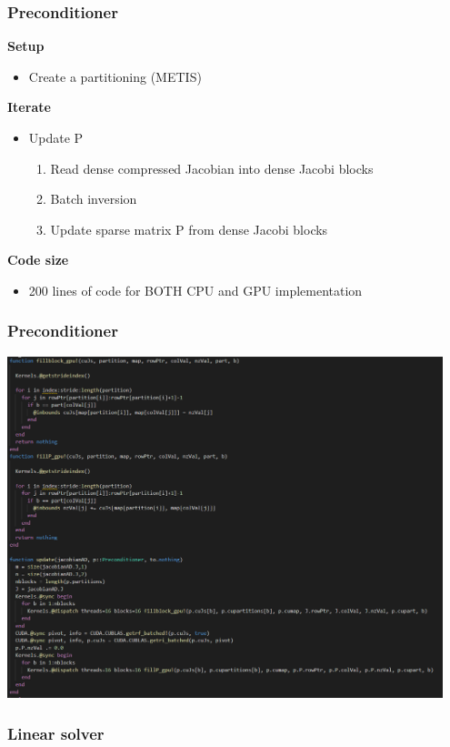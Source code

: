 \begin{frame}
  \frametitle{Preconditioner}
  {\bf Setup}
  \begin{itemize}
    \item Create a partitioning (METIS)
  \end{itemize}
  {\bf Iterate}
  \begin{itemize}
    \item Update P
    \begin{enumerate}
      \item Read dense compressed Jacobian into dense Jacobi blocks
      \item Batch inversion
      \item Update sparse matrix P from dense Jacobi blocks
    \end{enumerate}
  \end{itemize}
  {\bf Code size}
  \begin{itemize}
    \item 200 lines of code for BOTH CPU and GPU implementation
  \end{itemize}
\end{frame}

\begin{frame}
  \frametitle{Preconditioner}
  \includegraphics[width=0.95\textwidth]{figures/preconditioner}
\end{frame}

\begin{frame}
  \frametitle{Linear solver}
\end{frame}

